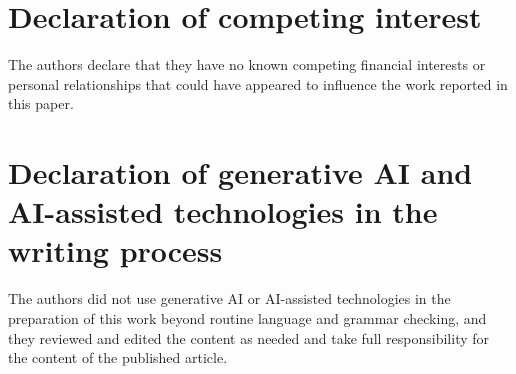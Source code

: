 \documentclass[a4paper,fleqn]{cas-dc}
\begin{document}
\printcredits

\section*{Declaration of competing interest}
The authors declare that they have no known competing financial interests or
personal relationships that could have appeared to influence the work reported
in this paper.

\section*{Declaration of generative AI and AI-assisted technologies in the
writing process}
The authors did not use generative AI or AI-assisted technologies in the
preparation of this work beyond routine language and grammar checking, and
they reviewed and edited the content as needed and take full responsibility
for the content of the published article.



\end{document}
